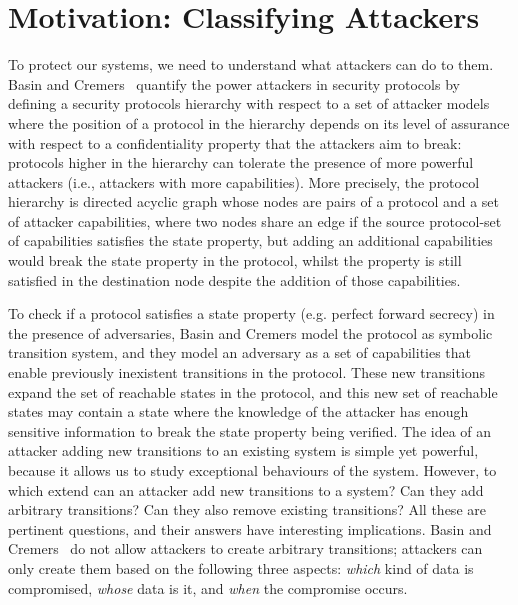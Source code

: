 \section{Motivation: Classifying Attackers} 
To protect our systems, we need to understand what attackers can do to them. Basin and Cremers~\cite{KnowYourEnemy} quantify the power attackers in security protocols by defining a security protocols hierarchy with respect to a set of attacker models where %
the position of a protocol in the hierarchy depends on its level of assurance with respect to a confidentiality property that the attackers aim to break: protocols higher in the hierarchy can tolerate the presence of more powerful attackers (i.e., attackers with more capabilities). More precisely, the protocol hierarchy is directed acyclic graph whose nodes are pairs of a protocol and a set of attacker capabilities, where two nodes share an edge if the source protocol-set of capabilities satisfies the state property, but adding an additional capabilities would break the state property in the protocol, whilst the property is still satisfied in the destination node despite the addition of those capabilities.

To check if a protocol satisfies a state property (e.g. perfect forward secrecy) in the presence of adversaries, Basin and Cremers model the protocol as symbolic transition system, and they model an adversary as a set of capabilities that enable previously inexistent transitions in the protocol. These new transitions expand the set of reachable states in the protocol, and this new set of reachable states may contain a state where the knowledge of the attacker has enough sensitive information to break the state property being verified. The idea of an attacker adding new transitions to an existing system is simple yet powerful, because it allows us to study exceptional behaviours of the system. However, to which extend can an attacker add new transitions to a system? Can they add arbitrary transitions? Can they also remove existing transitions? All these are pertinent questions, and their answers have interesting implications. Basin and Cremers~\cite{KnowYourEnemy} do not allow attackers to create arbitrary transitions; attackers can only create them based on the following three aspects: \emph{which} kind of data is compromised, \emph{whose} data is it, and \emph{when} the compromise occurs. 

